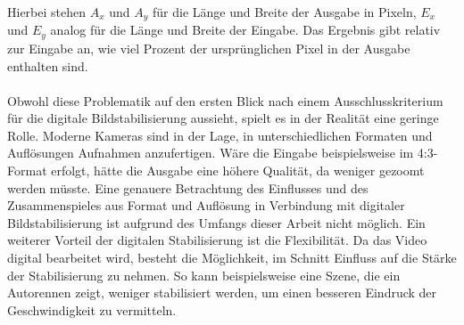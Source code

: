    Hierbei stehen $A_x$ und $A_y$ für die Länge und Breite der Ausgabe in Pixeln, $E_x$ und $E_y$
    analog für die Länge und Breite der Eingabe. Das Ergebnis gibt relativ zur Eingabe an, wie viel
    Prozent der ursprünglichen Pixel in der Ausgabe enthalten sind. \\
    \\
    Obwohl diese Problematik auf den ersten Blick nach einem Ausschlusskriterium für die digitale
    Bildstabilisierung aussieht, spielt es in der Realität eine geringe Rolle. Moderne Kameras sind
    in der Lage, in unterschiedlichen Formaten und Auflösungen Aufnahmen anzufertigen. Wäre die Eingabe
    beispielsweise im 4:3-Format erfolgt, hätte die Ausgabe eine höhere Qualität, da weniger gezoomt
    werden müsste. Eine genauere Betrachtung des Einflusses und des Zusammenspieles aus Format und
    Auflösung in Verbindung mit digitaler Bildstabilisierung ist aufgrund des Umfangs dieser Arbeit
    nicht möglich. Ein weiterer Vorteil der digitalen Stabilisierung ist die Flexibilität. Da das Video
    digital bearbeitet wird, besteht die Möglichkeit, im Schnitt Einfluss auf die Stärke der Stabilisierung
    zu nehmen. So kann beispielsweise eine Szene, die ein Autorennen zeigt, weniger stabilisiert werden,
    um einen besseren Eindruck der Geschwindigkeit zu vermitteln.